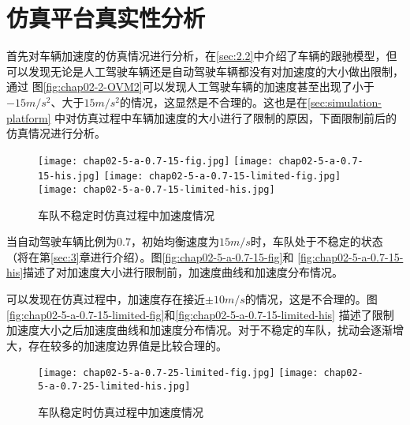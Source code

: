 \section{仿真平台真实性分析}

首先对车辆加速度的仿真情况进行分析，在\ref{sec:2.2}中介绍了车辆的跟驰模型，但可以发现无论是人工驾驶车辆还是自动驾驶车辆都没有对加速度的大小做出限制，通过
图\ref{fig:chap02-2-OVM2}可以发现人工驾驶车辆的加速度甚至出现了小于$-15m/s^2$、大于$15m/s^2$的情况，这显然是不合理的。这也是在\ref{sec:simulation-platform}
中对仿真过程中车辆加速度的大小进行了限制的原因，下面限制前后的仿真情况进行分析。

\begin{figure}
  \centering
    {\texttt{[image: chap02-5-a-0.7-15-fig.jpg]}}
    {\texttt{[image: chap02-5-a-0.7-15-his.jpg]}}
    {\texttt{[image: chap02-5-a-0.7-15-limited-fig.jpg]}}
    {\texttt{[image: chap02-5-a-0.7-15-limited-his.jpg]}}
  \caption{车队不稳定时仿真过程中加速度情况}
  \label{fig:chap02-5-a}
\end{figure}

当自动驾驶车辆比例为$0.7$，初始均衡速度为$15m/s$时，车队处于不稳定的状态（将在第\ref{sec:3}章进行介绍）。图\ref{fig:chap02-5-a-0.7-15-fig}和
\ref{fig:chap02-5-a-0.7-15-his}描述了对加速度大小进行限制前，加速度曲线和加速度分布情况。

可以发现在仿真过程中，加速度存在接近$\pm 10m/s$的情况，这是不合理的。图\ref{fig:chap02-5-a-0.7-15-limited-fig}和\ref{fig:chap02-5-a-0.7-15-limited-his}
描述了限制加速度大小之后加速度曲线和加速度分布情况。对于不稳定的车队，扰动会逐渐增大，存在较多的加速度边界值是比较合理的。

\begin{figure}
  \centering
    {\texttt{[image: chap02-5-a-0.7-25-limited-fig.jpg]}}
    {\texttt{[image: chap02-5-a-0.7-25-limited-his.jpg]}}
    \caption{车队稳定时仿真过程中加速度情况}
  \label{fig:chap02-6}
\end{figure}

